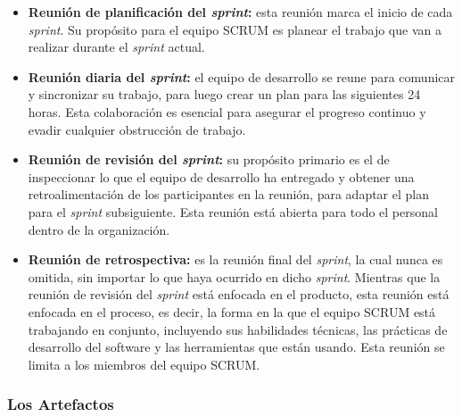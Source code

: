 			\begin{itemize}
				\item \textbf{Reuni\'{o}n de planificaci\'{o}n del \textit{sprint}: }
				esta reuni\'{o}n marca el inicio de cada \textit{sprint}. Su prop\'{o}sito para el equipo SCRUM es planear el trabajo que van a realizar durante el \textit{sprint} actual.
				
				\item \textbf{Reuni\'{o}n diaria del \textit{sprint}: }
				el equipo de desarrollo se reune para comunicar y sincronizar su trabajo, para luego crear un plan para las siguientes 24 horas. Esta colaboraci\'{o}n es esencial para asegurar el progreso continuo y evadir cualquier obstrucci\'{o}n de trabajo.
				
				\item \textbf{Reuni\'{o}n de revisi\'{o}n del \textit{sprint}: }
				su prop\'{o}sito primario es el de inspeccionar lo que el equipo de desarrollo ha entregado y obtener una retroalimentaci\'{o}n de los participantes en la reuni\'{o}n, para adaptar el plan para el \textit{sprint} subsiguiente. Esta reuni\'{o}n est\'{a} abierta para todo el personal dentro de la organizaci\'{o}n.
				
				\item \textbf{Reuni\'{o}n de retrospectiva: }
				es la reuni\'{o}n final del \textit{sprint}, la cual nunca es omitida, sin importar lo que haya ocurrido en dicho \textit{sprint}. Mientras que la reuni\'{o}n de revisi\'{o}n del \textit{sprint} est\'{a} enfocada en el producto, esta reuni\'{o}n est\'{a} enfocada en el proceso, es decir, la forma en la que el equipo SCRUM est\'{a} trabajando en conjunto, incluyendo sus habilidades t\'{e}cnicas, las pr\'{a}cticas de desarrollo del software y las herramientas que est\'{a}n usando. Esta reuni\'{o}n se limita a los miembros del equipo SCRUM.
				
			\end{itemize}
			
		\subsubsection{Los Artefactos}
			
